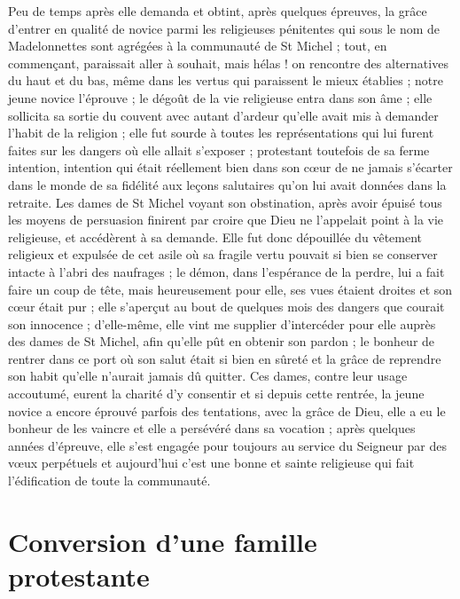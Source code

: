 \documentclass[11pt,a4paper]{report}
\begin{document}
Peu de temps après elle demanda et obtint, après quelques épreuves, la grâce d'entrer en qualité de novice parmi les religieuses pénitentes qui sous le nom de Madelonnettes sont agrégées à la communauté de St Michel ; tout, en commençant, paraissait aller à souhait, mais hélas ! on rencontre des alternatives du haut et du bas, même dans les vertus qui paraissent le mieux établies ; notre jeune novice l'éprouve ; le dégoût de la vie religieuse entra dans son âme ; elle sollicita sa sortie du couvent avec autant d'ardeur qu'elle avait mis à demander l'habit de la religion ; elle fut sourde à toutes les représentations qui lui furent faites sur les dangers où elle allait s'exposer ; protestant toutefois de sa ferme intention, intention qui était réellement bien dans son cœur de ne jamais s'écarter dans le monde de sa fidélité aux leçons salutaires qu'on lui avait données dans la retraite. Les dames de St Michel voyant son obstination, après avoir épuisé tous les moyens de persuasion finirent par croire que Dieu ne l'appelait point à la vie religieuse, et accédèrent à sa demande. Elle fut donc dépouillée du vêtement religieux et expulsée de cet asile où sa fragile vertu pouvait si bien se conserver intacte à l'abri des naufrages ; le démon, dans l'espérance de la perdre, lui a fait faire un coup de tête, mais heureusement pour elle, ses vues étaient droites et son cœur était pur ; elle s'aperçut au bout de quelques mois des dangers que courait son innocence ; d'elle-même, elle vint me supplier d'intercéder pour elle auprès des dames de St Michel, afin qu'elle pût en obtenir son pardon ; le bonheur de rentrer dans ce port où son salut était si bien en sûreté et la grâce de reprendre son habit qu'elle n'aurait jamais dû quitter. Ces dames, contre leur usage accoutumé, eurent la charité d'y consentir et si depuis cette rentrée, la jeune novice a encore éprouvé parfois des tentations, avec la grâce de Dieu, elle a eu le bonheur de les vaincre et elle a persévéré dans sa vocation ; après quelques années d'épreuve, elle s'est engagée pour toujours au service du Seigneur par des vœux perpétuels et aujourd'hui c'est une bonne et sainte religieuse qui fait l'édification de toute la communauté.

\section*{Conversion d'une famille protestante}
\end{document}
